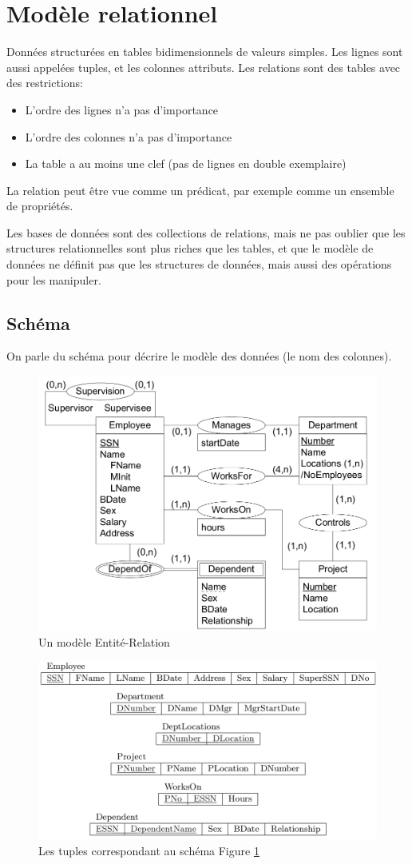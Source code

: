 \documentclass[a4paper]{article}
\begin{document}

\section{Modèle relationnel}
Données structurées en tables bidimensionnels de valeurs simples. Les lignes
sont aussi appelées tuples, et les colonnes attributs.
Les relations sont des tables avec des restrictions:
\begin{itemize}
  \item L'ordre des lignes n'a pas d'importance
  \item L'ordre des colonnes n'a pas d'importance
  \item La table a au moins une clef (pas de lignes en double exemplaire)
\end{itemize}
La relation peut être vue comme un prédicat, par exemple comme un ensemble de propriétés.

Les bases de données sont des collections de relations, mais ne pas oublier que
les structures relationnelles sont plus riches que les tables, et que le modèle de 
données ne définit pas que les structures de données, mais aussi des opérations
pour les manipuler.

\subsection{Schéma}
On parle du schéma pour décrire le modèle des données (le nom des colonnes).

\begin{figure}[H]
    \center
    \includegraphics[width=.5\textwidth]{fig/relmodel-er.png}
    \caption{\label{fig:relmodel-er}Un modèle Entité-Relation}
\end{figure}
\begin{figure}[H]
    \center
    \includegraphics[width=.7\textwidth]{fig/relmodel-tuples.png}
    \caption{Les tuples correspondant au schéma Figure \ref{fig:relmodel-er}}
\end{figure}
\end{document}
